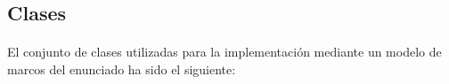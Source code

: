 \documentclass[10pt, a4paper,spanish]{article}
\begin{document}
		\subsection{Clases}

      \paragraph{}
      El conjunto de clases utilizadas para la implementación mediante un modelo de marcos del enunciado ha sido el siguiente:

			\begin{figure}[H]
				\centering
        
			\end{figure}

			\begin{figure}[H]
				\centering
        
			\end{figure}

			\begin{figure}[H]
				\centering
        
			\end{figure}

			\begin{figure}[H]
				\centering
        
			\end{figure}

			\begin{figure}[H]
				\centering
        
			\end{figure}

			\begin{figure}[H]
				\centering
        
			\end{figure}

			\begin{figure}[H]
				\centering
        
			\end{figure}

			\begin{figure}[H]
				\centering
        
			\end{figure}

			\begin{figure}[H]
				\centering
        
			\end{figure}
\end{document}
